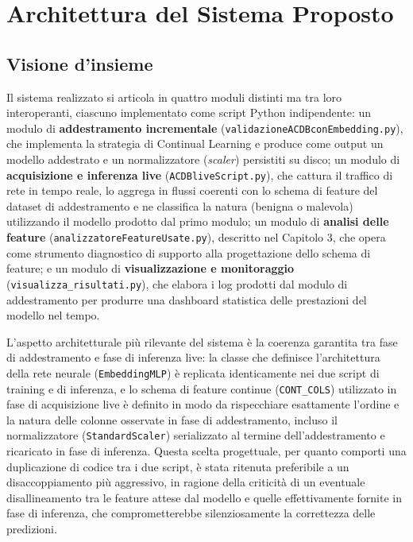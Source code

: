 \documentclass[12pt,a4paper]{report}
\begin{document}
\chapter{Architettura del Sistema Proposto}

\section{Visione d'insieme}

Il sistema realizzato si articola in quattro moduli distinti ma tra loro interoperanti, ciascuno implementato come script Python indipendente: un modulo di \textbf{addestramento incrementale} (\texttt{validazioneACDBconEmbedding.py}), che implementa la strategia di Continual Learning e produce come output un modello addestrato e un normalizzatore (\emph{scaler}) persistiti su disco; un modulo di \textbf{acquisizione e inferenza live} (\texttt{ACDBliveScript.py}), che cattura il traffico di rete in tempo reale, lo aggrega in flussi coerenti con lo schema di feature del dataset di addestramento e ne classifica la natura (benigna o malevola) utilizzando il modello prodotto dal primo modulo; un modulo di \textbf{analisi delle feature} (\texttt{analizzatoreFeatureUsate.py}), descritto nel Capitolo 3, che opera come strumento diagnostico di supporto alla progettazione dello schema di feature; e un modulo di \textbf{visualizzazione e monitoraggio} (\texttt{visualizza\_risultati.py}), che elabora i log prodotti dal modulo di addestramento per produrre una dashboard statistica delle prestazioni del modello nel tempo.

L'aspetto architetturale più rilevante del sistema è la coerenza garantita tra fase di addestramento e fase di inferenza live: la classe che definisce l'architettura della rete neurale (\texttt{EmbeddingMLP}) è replicata identicamente nei due script di training e di inferenza, e lo schema di feature continue (\texttt{CONT\_COLS}) utilizzato in fase di acquisizione live è definito in modo da rispecchiare esattamente l'ordine e la natura delle colonne osservate in fase di addestramento, incluso il normalizzatore (\texttt{StandardScaler}) serializzato al termine dell'addestramento e ricaricato in fase di inferenza. Questa scelta progettuale, per quanto comporti una duplicazione di codice tra i due script, è stata ritenuta preferibile a un disaccoppiamento più aggressivo, in ragione della criticità di un eventuale disallineamento tra le feature attese dal modello e quelle effettivamente fornite in fase di inferenza, che comprometterebbe silenziosamente la correttezza delle predizioni.
\end{document}
